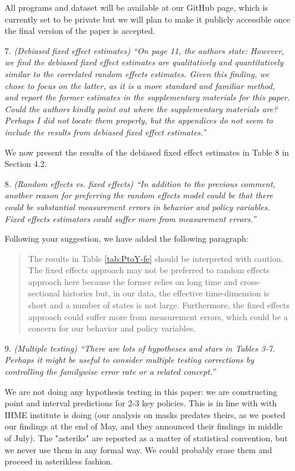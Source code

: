 \documentclass[11pt]{article}
\begin{document}
\begin{itemize}
All programs and dataset will be available at our GitHub page, which is currently set to be private but we will plan to make it publicly accessible once the final version of the paper is accepted.
  
\item[7.]  \textit{(Debiased fixed effect estimates) ``On page 11, the authors state:
However, we find the debiased fixed effect estimates are qualitatively and quantitatively
similar to the correlated random effects estimates. Given this finding,
we chose to focus on the latter, as it is a more standard and familiar method, and
report the former estimates in the supplementary materials for this paper.
Could the authors kindly point out where the supplementary materials are? Perhaps I did not
locate them properly, but the appendices do not seem to include the results from debiased
fixed effect estimates.''}

We now present the results of the debiased fixed effect estimates in Table 8 in Section 4.2. 
  
\item[8.]  \textit{(Random effects vs. fixed effects) ``In addition to the previous comment, another reason for
preferring the random effects model could be that there could be substantial measurement
errors in behavior and policy variables. Fixed effects estimators could suffer more from measurement
errors.''}

Following your suggestion, we have added the following paragraph:
\begin{quote}
The results in Table \ref{tab:PtoY-fe} should be interpreted with caution. The fixed effects approach may not be preferred to random effects approach here because the former relies on long time and cross-sectional histories but, in our data, the effective time-dimension is short and a number of states is not large. Furthermore, the fixed effects approach could suffer more from  measurement errors, which could be a concern for our behavior and policy variables.
\end{quote}
  
\item[9.]  \textit{(Multiple testing) ``There are lots of hypotheses and stars in Tables 3-7. Perhaps it might be
useful to consider multiple testing corrections by controlling the familywise error rate or a
related concept.''}

We are not doing any hypothesis testing in this paper: we are constructing point and interval predictions for 2-3 key policies. This
is in line with with IHME institute is doing (our analysis on masks predates theirs, as we posted our findings
at the end of May, and they announced their findings in middle of July). The 
"asteriks" are reported as a matter of statistical convention, but we never use them in any formal way. We could probably
erase them and proceed in asterikless fashion.


\end{itemize}
\end{document}
